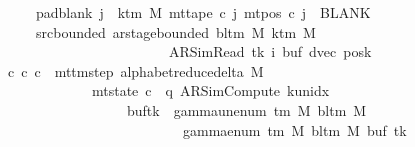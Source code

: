 \begin{isabellebody}
\ \ \ \ \ \ \ pad{\isacharunderscore}{\kern0pt}blank{\isacharcolon}{\kern0pt}\ {\isachardoublequoteopen}{\isasymforall}j\ {\isasymge}\ k{\isacharunderscore}{\kern0pt}tm\ M{\isachardot}{\kern0pt}\ mt{\isacharunderscore}{\kern0pt}tape\ c{\isacharprime}{\kern0pt}\ j\ {\isacharparenleft}{\kern0pt}mt{\isacharunderscore}{\kern0pt}pos\ c{\isacharprime}{\kern0pt}\ j{\isacharparenright}{\kern0pt}\ {\isacharequal}{\kern0pt}\ BLANK{}{\isachardoublequoteclose}\isanewline
\ \ \ \ \ \ \ src{\isacharunderscore}{\kern0pt}bounded{\isacharcolon}{\kern0pt}\ {\isachardoublequoteopen}ar{\isacharunderscore}{\kern0pt}stage{\isacharunderscore}{\kern0pt}bounded\ {\isacharparenleft}{\kern0pt}bl{\isacharunderscore}{\kern0pt}tm\ M{\isacharparenright}{\kern0pt}\ {\isacharparenleft}{\kern0pt}k{\isacharunderscore}{\kern0pt}tm\ M{\isacharparenright}{\kern0pt}\isanewline
\ \ \ \ \ \ \ \ \ \ \ \ \ \ \ \ \ \ \ \ \ \ \ \ \ \ {\isacharparenleft}{\kern0pt}AR{\isacharunderscore}{\kern0pt}SimRead{\isacharcomma}{\kern0pt}\ tk{\isacharcomma}{\kern0pt}\ i{\isacharcomma}{\kern0pt}\ buf{\isacharcomma}{\kern0pt}\ dvec{\isacharcomma}{\kern0pt}\ posk{\isacharparenright}{\kern0pt}{\isachardoublequoteclose}\isanewline
\ \ \ {\isachardoublequoteopen}{\isasymexists}c{\isacharprime}{\kern0pt}{\isacharprime}{\kern0pt}{\isachardot}{\kern0pt}\ {\isacharparenleft}{\kern0pt}c{\isacharprime}{\kern0pt}{\isacharcomma}{\kern0pt}\ c{\isacharprime}{\kern0pt}{\isacharprime}{\kern0pt}{\isacharparenright}{\kern0pt}\ {\isasymin}\ mttm{\isacharunderscore}{\kern0pt}step\ {\isacharparenleft}{\kern0pt}alphabet{\isacharunderscore}{\kern0pt}reduce{\isacharunderscore}{\kern0pt}delta\ M{\isacharparenright}{\kern0pt}\isanewline
\ \ \ \ \ \ \ \ \ \ \ \ \ \ {\isasymand}\ mt{\isacharunderscore}{\kern0pt}state\ c{\isacharprime}{\kern0pt}{\isacharprime}{\kern0pt}\ {\isacharequal}{\kern0pt}\ {\isacharparenleft}{\kern0pt}q{\isacharcomma}{\kern0pt}\ AR{\isacharunderscore}{\kern0pt}SimCompute{\isacharcomma}{\kern0pt}\ k{\isacharunderscore}{\kern0pt}unidx\ {}{\isacharcomma}{\kern0pt}\ {}{\isacharcomma}{\kern0pt}\isanewline
\ \ \ \ \ \ \ \ \ \ \ \ \ \ \ \ \ \ \ \ buf{\isacharparenleft}{\kern0pt}tk\ {\isacharcolon}{\kern0pt}{\isacharequal}{\kern0pt}\ gamma{\isacharunderscore}{\kern0pt}unenum\ {\isacharparenleft}{\kern0pt}{\isasymGamma}{\isacharunderscore}{\kern0pt}tm\ M{\isacharparenright}{\kern0pt}\ {\isacharparenleft}{\kern0pt}bl{\isacharunderscore}{\kern0pt}tm\ M{\isacharparenright}{\kern0pt}\isanewline
\ \ \ \ \ \ \ \ \ \ \ \ \ \ \ \ \ \ \ \ \ \ \ \ \ \ {\isacharparenleft}{\kern0pt}{}\ {\isacharasterisk}{\kern0pt}\ gamma{\isacharunderscore}{\kern0pt}enum\ {\isacharparenleft}{\kern0pt}{\isasymGamma}{\isacharunderscore}{\kern0pt}tm\ M{\isacharparenright}{\kern0pt}\ {\isacharparenleft}{\kern0pt}bl{\isacharunderscore}{\kern0pt}tm\ M{\isacharparenright}{\kern0pt}\ {\isacharparenleft}{\kern0pt}buf\ tk{\isacharparenright}{\kern0pt}\isanewline

\end{isabellebody}
